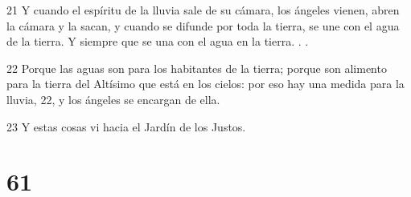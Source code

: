 \par 21 Y cuando el espíritu de la lluvia sale de su cámara, los ángeles vienen, abren la cámara y la sacan, y cuando se difunde por toda la tierra, se une con el agua de la tierra. Y siempre que se una con el agua en la tierra. . .
\par 22 Porque las aguas son para los habitantes de la tierra; porque son alimento para la tierra del Altísimo que está en los cielos: por eso hay una medida para la lluvia, 22, y los ángeles se encargan de ella.
\par 23 Y estas cosas vi hacia el Jardín de los Justos.

\chapter{61}

